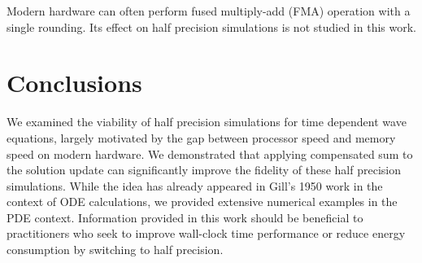 \documentclass[10pt]{article}
\begin{document}
\begin{remark}[FMA]
%
Modern hardware can often perform fused multiply-add (FMA) operation with a single rounding. 
%
Its effect on half precision simulations is not studied in this work.
%
\end{remark}


\section{Conclusions}\label{sec_conclusion}
%
We examined the viability of half precision simulations for time dependent wave equations, largely motivated by the gap between processor speed and memory speed on modern hardware.
%
We demonstrated that applying compensated sum to the solution update can significantly improve the fidelity of these half precision simulations.
%
While the idea has already appeared in Gill's 1950 work in the context of ODE calculations, we provided extensive numerical examples in the PDE context.
%
Information provided in this work should be beneficial to practitioners who seek to improve wall-clock time performance or reduce energy consumption by switching to half precision.


\addtolength{\bibsep}{-0.5em}
\renewcommand{\bibfont}{\normalfont\small}
% 





\newpage

\end{document}
